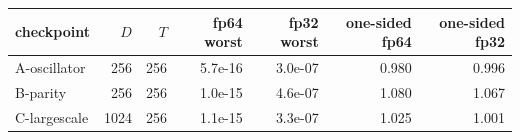 \begin{tabular}{lrrrrrr}
\toprule
checkpoint & $D$ & $T$ & fp64 worst & fp32 worst & one-sided fp64 & one-sided fp32 \\
\midrule
A-oscillator & 256 & 256 & 5.7e-16 & 3.0e-07 & 0.980 & 0.996 \\
B-parity & 256 & 256 & 1.0e-15 & 4.6e-07 & 1.080 & 1.067 \\
C-largescale & 1024 & 256 & 1.1e-15 & 3.3e-07 & 1.025 & 1.001 \\
\bottomrule
\end{tabular}

